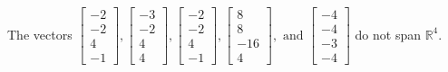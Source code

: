\begin{exercise}
\begin{exerciseStatement}
  \end{exerciseStatement}
  \begin{exerciseAnswer}
   The vectors \(\left[\begin{array}{r}
-2 \\
-2 \\
4 \\
-1
\end{array}\right] , \left[\begin{array}{r}
-3 \\
-2 \\
4 \\
4
\end{array}\right] , \left[\begin{array}{r}
-2 \\
-2 \\
4 \\
-1
\end{array}\right] , \left[\begin{array}{r}
8 \\
8 \\
-16 \\
4
\end{array}\right] , \text{ and } \left[\begin{array}{r}
-4 \\
-4 \\
-3 \\
-4
\end{array}\right]\) 
  	 do not  
	span \(\mathbb{R}^4\).
  


  \end{exerciseAnswer}
\end{exercise}